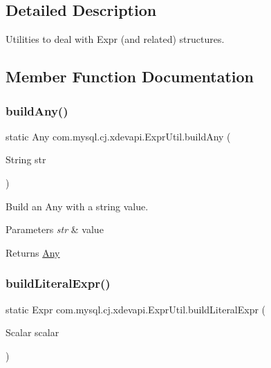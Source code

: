 \subsection{Detailed Description}
Utilities to deal with Expr (and related) structures. 

\subsection{Member Function Documentation}
\mbox{\label{classcom_1_1mysql_1_1cj_1_1xdevapi_1_1_expr_util_a458c1372111de4a2a83a79ba595a89e5}} 
\subsubsection{\texorpdfstring{build\+Any()}{buildAny()}}
{\footnotesize\ttfamily static Any com.\+mysql.\+cj.\+xdevapi.\+Expr\+Util.\+build\+Any (\begin{DoxyParamCaption}\item[{String}]{str }\end{DoxyParamCaption})\hspace{0.3cm}{\ttfamily [static]}}

Build an Any with a string value.


\begin{DoxyParams}{Parameters}
{\em str} & value \\
\hline
\end{DoxyParams}
\begin{DoxyReturn}{Returns}
\mbox{\hyperlink{}{Any}} 
\end{DoxyReturn}
\mbox{\label{classcom_1_1mysql_1_1cj_1_1xdevapi_1_1_expr_util_a2afeea823683209f07637ea40323715b}} 
\subsubsection{\texorpdfstring{build\+Literal\+Expr()}{buildLiteralExpr()}}
{\footnotesize\ttfamily static Expr com.\+mysql.\+cj.\+xdevapi.\+Expr\+Util.\+build\+Literal\+Expr (\begin{DoxyParamCaption}\item[{Scalar}]{scalar }\end{DoxyParamCaption})\hspace{0.3cm}{\ttfamily [static]}}

